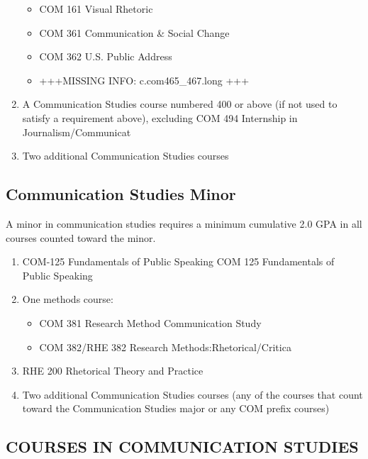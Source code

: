 \documentclass[
  letterpaper,
]{scrbook}
\providecommand{\tightlist}{%
  \setlength{\itemsep}{0pt}\setlength{\parskip}{0pt}}
\begin{document}
\begin{enumerate}
  \begin{itemize}
  \tightlist
  \item
    COM 161 Visual Rhetoric
  \item
    COM 361 Communication \& Social Change
  \item
    COM 362 U.S. Public Address
  \item
    +++MISSING INFO: c.com465\_467.long +++
  \end{itemize}
\item
  A Communication Studies course numbered 400 or above (if not used to
  satisfy a requirement above), excluding COM 494 Internship in
  Journalism/Communicat
\item
  Two additional Communication Studies courses
\end{enumerate}

\subsection{Communication Studies
Minor}\label{communication-studies-minor}

A minor in communication studies requires a minimum cumulative 2.0 GPA
in all courses counted toward the minor.

\begin{enumerate}
\def\labelenumi{\arabic{enumi}.}
\tightlist
\item
  COM-125 Fundamentals of Public Speaking COM 125 Fundamentals of Public
  Speaking
\item
  One methods course:

  \begin{itemize}
  \tightlist
  \item
    COM 381 Research Method Communication Study
  \item
    COM 382/RHE 382 Research Methods:Rhetorical/Critica
  \end{itemize}
\item
  RHE 200 Rhetorical Theory and Practice
\item
  Two additional Communication Studies courses (any of the courses that
  count toward the Communication Studies major or any COM prefix
  courses)
\end{enumerate}

\subsection{COURSES IN COMMUNICATION
STUDIES}\label{courses-in-communication-studies}
\end{document}
